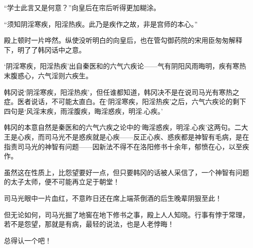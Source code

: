 “学士此言又是何意？”向皇后在帘后听得更加糊涂。

“须知阴淫寒疾，阳淫热疾。此乃是疾作之故，非是宫师的本心。”

殿上顿时一片哗然。纵使没听明白的向皇后，也在管勾御药院的宋用臣匆匆解释下，明了了韩冈话中之意。

‘阴淫寒疾，阳淫热疾’出自秦医和的六气六疾论——气有阴阳风雨晦明，疾有寒热末腹惑心，六气淫则六疾生。

韩冈说‘阴淫寒疾，阳淫热疾’，但任谁都知道，韩冈决不是在说司马光有寒热之症。医者说话，不可能太直白。在‘阴淫寒疾，阳淫热疾’之后，六气六疾论的剩下四句是‘风淫末疾，雨淫腹疾，晦淫惑疾，明淫.心疾。’

韩冈的本意自然是秦医和的六气六疾之论中的‘晦淫惑疾，明淫.心疾’这两句。二大王是心疾，而司马光不是惑疾就是心疾——反正心疾、惑疾都是神智有毛病，是在指责司马光的神智有问题——因新法不得不在洛阳修书十余年，郁愤在心，以至疾作。

虽然这在性质上，比怨望要好一点，但只要韩冈的话被人采信了，一个神智有问题的太子太师，便不可能再立足于朝堂！

司马光眼中一片血红，不意昨日还在席上端茶倒酒的后生晚辈阴狠至此！

但无论如何，司马光掘了地窖在地下修书之事，殿上人人知晓。行事有悖于常理，若不是怨望，那就是有病，最轻的说法，也是人老悖晦！

总得认一个吧！

